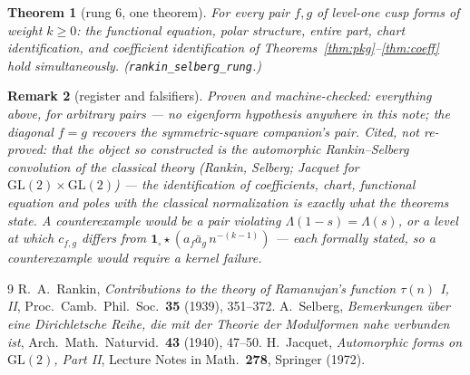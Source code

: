 \documentclass[11pt]{article}
\newtheorem{theorem}{Theorem}
\newtheorem{remark}[theorem]{Remark}
\begin{document}
\begin{theorem}[rung 6, one theorem]\label{thm:rung6}
For every pair $f,g$ of level-one cusp forms of weight $k\ge0$: the functional equation,
polar structure, entire part, chart identification, and coefficient identification of
Theorems~\ref{thm:pkg}--\ref{thm:coeff} hold simultaneously.
(\texttt{rankin\_selberg\_rung}.)
\end{theorem}

\begin{remark}[register and falsifiers]
Proven and machine-checked: everything above, for arbitrary pairs --- no eigenform
hypothesis anywhere in this note; the diagonal $f=g$ recovers the symmetric-square
companion's pair.  Cited, not re-proved: that the object so constructed is the
automorphic Rankin--Selberg convolution of the classical theory (Rankin, Selberg;
Jacquet for $\mathrm{GL}(2)\times\mathrm{GL}(2)$) --- the identification of coefficients,
chart, functional equation and poles with the classical normalization is exactly what the
theorems state.  A counterexample would be a pair violating $\Lambda(1-s)=\Lambda(s)$, or
a level at which $c_{f,g}$ differs from
$\mathbf 1_\square\star(a_f\bar a_g\,n^{-(k-1)})$ --- each formally stated, so a
counterexample would require a kernel failure.
\end{remark}

\begin{thebibliography}{9}
 R.~A.~Rankin, \emph{Contributions to the theory of Ramanujan's function
$\tau(n)$ I, II}, Proc.\ Camb.\ Phil.\ Soc.\ \textbf{35} (1939), 351--372.
 A.~Selberg, \emph{Bemerkungen über eine Dirichletsche Reihe, die mit der
Theorie der Modulformen nahe verbunden ist}, Arch.\ Math.\ Naturvid.\ \textbf{43} (1940),
47--50.
 H.~Jacquet, \emph{Automorphic forms on $\mathrm{GL}(2)$, Part II}, Lecture
Notes in Math.\ \textbf{278}, Springer (1972).
\end{thebibliography}
\end{document}
